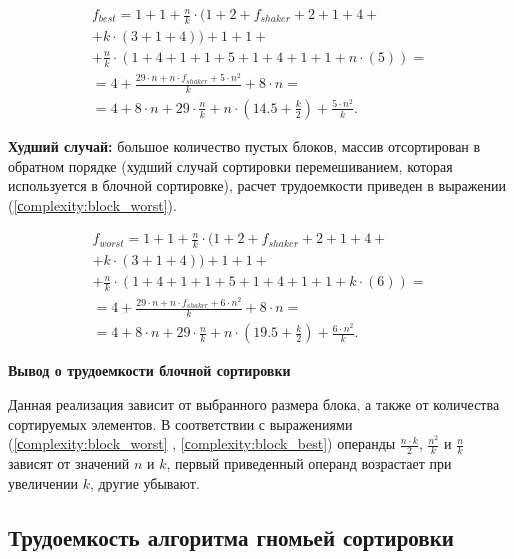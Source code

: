 \begin{equation}
	\label{сomplexity:block_best}
	\begin{gathered}
		f_{best} = 1 +1 + \frac{n}{k} \cdot(1 + 2+f_{shaker} + 2 + 1 + 4 + \\
		+ k \cdot (3 + 1 + 4)) + 1 + 1 + \\
		+ \frac{n}{k} \cdot (1 + 4 + 1 + 1 + 5 + 1 + 4 + 1 + 1 + n \cdot (5)) = \\
		= 4 + \frac{29\cdot n + n \cdot f_{shaker} + 5 \cdot n^2}{k}  + 8 \cdot n  = \\
		= 4 + 8 \cdot n + 29 \cdot \frac{n}{k} + n \cdot (14.5 + \frac{k}{2}) + \frac{5 \cdot n^2}{k}.
	\end{gathered}
\end{equation}

\textbf{Худший случай:} большое количество пустых блоков, массив отсортирован в обратном порядке (худший случай сортировки перемешиванием, которая используется в блочной сортировке), расчет трудоемкости приведен в выражении (\ref{сomplexity:block_worst}).

\begin{equation}
	\label{сomplexity:block_worst}
	\begin{gathered}
		f_{worst} = 1 +1 + \frac{n}{k} \cdot(1 + 2+f_{shaker} + 2 + 1 + 4 + \\
		+ k \cdot (3 + 1 + 4)) + 1 + 1 + \\
		 + \frac{n}{k} \cdot (1 + 4 + 1 + 1 + 5 + 1 + 4 + 1 + 1 + k \cdot (6)) = \\
		= 4 + \frac{29\cdot n + n \cdot f_{shaker} + 6 \cdot n^2}{k}  + 8 \cdot n  = \\
		= 4 + 8 \cdot n + 29 \cdot \frac{n}{k} + n \cdot (19.5 + \frac{k}{2}) + \frac{6 \cdot n^2}{k}.
	\end{gathered}
\end{equation}


\textbf{Вывод о трудоемкости блочной сортировки}

Данная реализация зависит от выбранного размера блока, а также от количества сортируемых элементов. В соответствии с выражениями (\ref{сomplexity:block_worst} , \ref{сomplexity:block_best})  операнды $\frac{n \cdot k}{2}$, $\frac{n^2}{k}$ и $\frac{n}{k}$ зависят от значений $n$ и $k$, первый приведенный операнд возрастает при увеличении $k$, другие убывают.


\subsection{Трудоемкость алгоритма гномьей сортировки}

